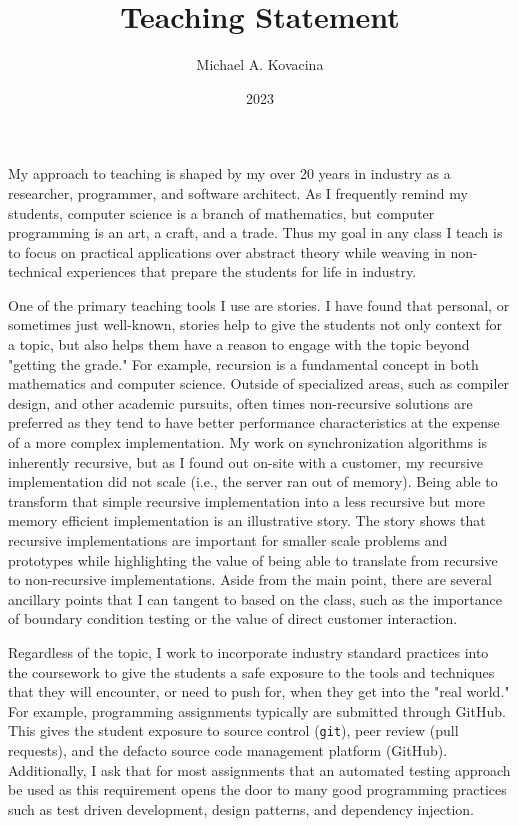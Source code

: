 \documentclass[12pt]{article}
\title{Teaching Statement}
\author{Michael A. Kovacina}
\date{2023}
\begin{document}
  \maketitle

My approach to teaching is shaped by my over 20 years in industry as a researcher, programmer, and software architect.  As I frequently remind my students, computer science is a branch of mathematics, but computer programming is an art, a craft, and a trade.  Thus my goal in any class I teach is to focus on practical applications over abstract theory while weaving in non-technical experiences that prepare the students for life in industry.

One of the primary teaching tools I use are stories.  I have found that personal, or sometimes just well-known, stories help to give the students not only context for a topic, but also helps them have a reason to engage with the topic beyond "getting the grade."  For example, recursion is a fundamental concept in both mathematics and computer science.  Outside of specialized areas, such as compiler design, and other academic pursuits, often times non-recursive solutions are preferred as they tend to have better performance characteristics at the expense of a more complex implementation.  My work on synchronization algorithms is inherently recursive, but as I found out on-site with a customer, my recursive implementation did not scale (i.e., the server ran out of memory).  Being able to transform that simple recursive implementation into a less recursive but more memory efficient implementation is an illustrative story.  The story shows that recursive implementations are important for smaller scale problems and prototypes while highlighting the value of being able to translate from recursive to non-recursive implementations.  Aside from the main point, there are several ancillary points that I can tangent to based on the class, such as the importance of boundary condition testing or the value of direct customer interaction.

Regardless of the topic, I work to incorporate industry standard practices into the coursework to give the students a safe exposure to the tools and techniques that they will encounter, or need to push for, when they get into the "real world."  For example, programming assignments typically are submitted through GitHub.  This gives the student exposure to source control (\texttt{git}), peer review (pull requests), and the defacto source code management platform (GitHub).  Additionally, I ask that for most assignments that an automated testing approach be used as this requirement opens the door to many good programming practices such as test driven development, design patterns, and dependency injection.
\end{document}
